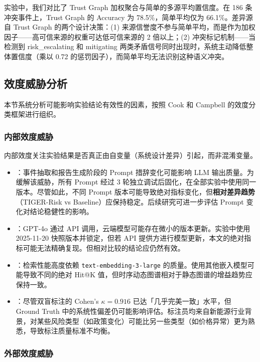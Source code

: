 实验中，我们对比了 Trust Graph 加权聚合与简单的多源平均置信度。在 186 条冲突事件上，Trust Graph 的 Accuracy 为 78.5\%，简单平均仅为 66.1\%。差异源自 Trust Graph 的两个设计决策：(1) 来源信誉度不参与简单平均，而是作为加权因子——高可信来源的权重可达低可信来源的 2 倍以上；(2) 冲突标记机制——当检测到 risk\_escalating 和 mitigating 两类矛盾信号同时出现时，系统主动降低整体置信度（乘以 0.72 的惩罚因子），而简单平均无法识别这种语义冲突。

\subsection{效度威胁分析}
\label{sec:exp-threats}

本节系统分析可能影响实验结论有效性的因素，按照 Cook 和 Campbell 的效度分类框架进行组织。

\subsubsection{内部效度威胁}

内部效度关注实验结果是否真正由自变量（系统设计差异）引起，而非混淆变量。

\begin{itemize}
    \item {}：事件抽取和报告生成阶段的 Prompt 措辞变化可能影响 LLM 输出质量。为缓解该威胁，所有 Prompt 经过 3 轮独立调试后固化，在全部实验中使用同一版本。尽管如此，不同 Prompt 版本可能导致绝对指标变化，但\textbf{相对差异趋势}（TIGER-Risk vs Baseline）应保持稳定。后续研究可进一步评估 Prompt 变化对结论稳健性的影响。
    \item {}：GPT-4o 通过 API 调用，云端模型可能存在微小的版本更新。实验中使用 2025-11-20 快照版本并锁定，但若 API 提供方进行模型更新，本文的绝对指标可能无法精确复现。但相对比较的结论应仍然有效。
    \item {}：检索性能高度依赖 \texttt{text-embedding-3-large} 的质量。使用其他嵌入模型可能导致不同的绝对 Hit@K 值，但时序动态图谱相对于静态图谱的增益趋势应保持一致。
    \item {}：尽管双盲标注的 Cohen's $\kappa = 0.916$ 已达「几乎完美一致」水平，但 Ground Truth 中的系统性偏差仍可能影响评估。标注员均来自新能源行业背景，对某些风险类型（如政策变化）可能比另一些类型（如价格异常）更为熟悉，导致标注质量标准不均衡。
\end{itemize}

\subsubsection{外部效度威胁}

